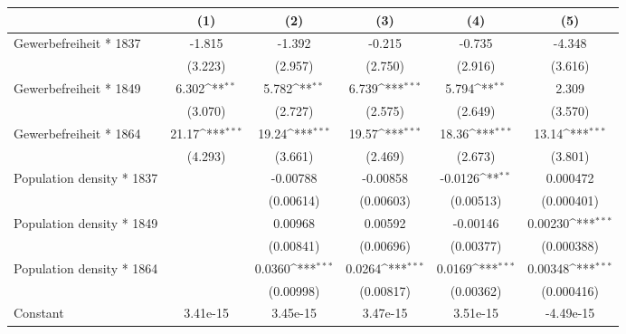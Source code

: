 {
\def\sym#1{\ifmmode^{#1}\else\(^{#1}\)\fi}
\begin{tabular}{l*{5}{c}}
\hline\hline
                    &\multicolumn{1}{c}{(1)}         &\multicolumn{1}{c}{(2)}         &\multicolumn{1}{c}{(3)}         &\multicolumn{1}{c}{(4)}         &\multicolumn{1}{c}{(5)}         \\
\hline
Gewerbefreiheit * 1837&      -1.815         &      -1.392         &      -0.215         &      -0.735         &      -4.348         \\
                    &     (3.223)         &     (2.957)         &     (2.750)         &     (2.916)         &     (3.616)         \\
[1em]
Gewerbefreiheit * 1849&       6.302\sym{**} &       5.782\sym{**} &       6.739\sym{***}&       5.794\sym{**} &       2.309         \\
                    &     (3.070)         &     (2.727)         &     (2.575)         &     (2.649)         &     (3.570)         \\
[1em]
Gewerbefreiheit * 1864&       21.17\sym{***}&       19.24\sym{***}&       19.57\sym{***}&       18.36\sym{***}&       13.14\sym{***}\\
                    &     (4.293)         &     (3.661)         &     (2.469)         &     (2.673)         &     (3.801)         \\
[1em]
Population density * 1837&                     &    -0.00788         &    -0.00858         &     -0.0126\sym{**} &    0.000472         \\
                    &                     &   (0.00614)         &   (0.00603)         &   (0.00513)         &  (0.000401)         \\
[1em]
Population density * 1849&                     &     0.00968         &     0.00592         &    -0.00146         &     0.00230\sym{***}\\
                    &                     &   (0.00841)         &   (0.00696)         &   (0.00377)         &  (0.000388)         \\
[1em]
Population density * 1864&                     &      0.0360\sym{***}&      0.0264\sym{***}&      0.0169\sym{***}&     0.00348\sym{***}\\
                    &                     &   (0.00998)         &   (0.00817)         &   (0.00362)         &  (0.000416)         \\
[1em]
Constant            &    3.41e-15         &    3.45e-15         &    3.47e-15         &    3.51e-15         &   -4.49e-15         \\

\end{tabular}}
